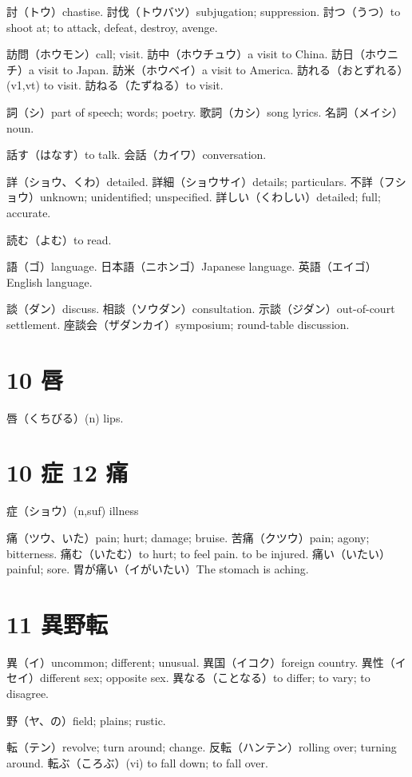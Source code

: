 討（トウ）chastise.
討伐（トウバツ）subjugation; suppression.
討つ（うつ）to shoot at; to attack, defeat, destroy, avenge.

訪問（ホウモン）call; visit.
訪中（ホウチュウ）a visit to China.
訪日（ホウニチ）a visit to Japan.
訪米（ホウベイ）a visit to America.
訪れる（おとずれる）(v1,vt) to visit.
訪ねる（たずねる）to visit.

詞（シ）part of speech; words; poetry.
歌詞（カシ）song lyrics.
名詞（メイシ）noun.

話す（はなす）to talk.
会話（カイワ）conversation.

詳（ショウ、くわ）detailed.
詳細（ショウサイ）details; particulars.
不詳（フショウ）unknown; unidentified; unspecified.
詳しい（くわしい）detailed; full; accurate.

読む（よむ）to read.

語（ゴ）language.
日本語（ニホンゴ）Japanese language.
英語（エイゴ）English language.

談（ダン）discuss.
相談（ソウダン）consultation.
示談（ジダン）out-of-court settlement.
座談会（ザダンカイ）symposium; round-table discussion.

\section{10 唇}

唇（くちびる）(n) lips.

\section{10 症 12 痛}

症（ショウ）(n,suf) illness

痛（ツウ、いた）pain; hurt; damage; bruise.
苦痛（クツウ）pain; agony; bitterness.
痛む（いたむ）to hurt; to feel pain. to be injured.
痛い（いたい）painful; sore.
胃が痛い（イがいたい）The stomach is aching.

\section{11 異野転}

異（イ）uncommon; different; unusual.
異国（イコク）foreign country.
異性（イセイ）different sex; opposite sex.
異なる（ことなる）to differ; to vary; to disagree.

野（ヤ、の）field; plains; rustic.

転（テン）revolve; turn around; change.
反転（ハンテン）rolling over; turning around.
転ぶ（ころぶ）(vi) to fall down; to fall over.

